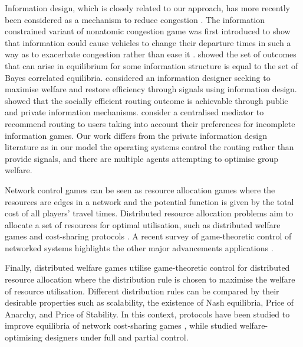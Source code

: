 \documentclass{article}
\begin{document}
  Information design, which is closely related to our approach, has more recently been considered as a mechanism to reduce congestion \cite{Acemoglu2016InformationalCongestion,Meir2018,Roman}. The information constrained variant of nonatomic congestion game was first introduced to show that information could cause vehicles to change their departure times in such a way as to exacerbate congestion rather than ease it \cite{Arnott}. \cite{Bergemann2013} showed the set of outcomes that can arise in equilibrium for some information structure is equal to the set of Bayes correlated equilibria. \cite{Das2017} considered an information designer seeking to maximise welfare and restore efficiency through signals using information design. \cite{Tavafoghi2018} showed that the socially efficient routing outcome is achievable through public and private information mechanisms. \cite{Ikegami2020} consider a centralised mediator to recommend routing to users taking into account their preferences for incomplete information games. Our work differs from the private information design literature as in our model the operating systems control the routing rather than provide signals, and there are multiple agents attempting to optimise group welfare.

  Network control games can be seen as resource allocation games where the resources are edges in a network and the potential function is given by the total cost of all players' travel times. Distributed resource allocation problems aim to allocate a set of resources for optimal utilisation, such as distributed welfare games \cite{Marden2013} and cost-sharing protocols \cite{Chen2010}. A recent survey of game-theoretic control of networked systems highlights the other major advancements applications \cite{Wu2019}.  

  Finally, distributed welfare games \cite{Marden2013} utilise game-theoretic control for distributed resource allocation where the distribution rule is chosen to maximise the welfare of resource utilisation. Different distribution rules can be compared by their desirable properties such as scalability, the existence of Nash equilibria, Price of Anarchy, and Price of Stability. In this context, protocols have been studied to improve equilibria of network cost-sharing games \cite{Chen2010}, while \cite{Hao2018} studied welfare-optimising designers under full and partial control. %
\end{document}

